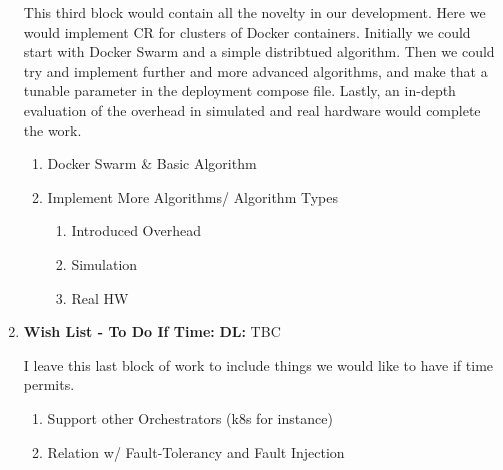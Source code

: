 \documentclass[a4paper, 10pt]{article}
\begin{document}
\begin{enumerate}
        This third block would contain all the novelty in our development. Here we would implement CR for clusters of Docker containers. Initially we could start with Docker Swarm and a simple distribtued algorithm. Then we could try and implement further and more advanced algorithms, and make that a tunable parameter in the deployment compose file. Lastly, an in-depth evaluation of the overhead in simulated and real hardware would complete the work.
    \begin{enumerate}
        \item Docker Swarm \& Basic Algorithm
        \item Implement More Algorithms/ Algorithm Types
        \begin{enumerate}
            \item Introduced Overhead
            \item Simulation
            \item Real HW
        \end{enumerate}
    \end{enumerate}
    \item \textbf{Wish List - To Do If Time:} \hfill \textbf{DL:} TBC

        I leave this last block of work to include things we would like to have if time permits.
    \begin{enumerate}
        \item Support other Orchestrators (k8s for instance)
        \item Relation w/ Fault-Tolerancy and Fault Injection
    \end{enumerate}
\end{enumerate}

\vspace{5pt}



\end{document}
